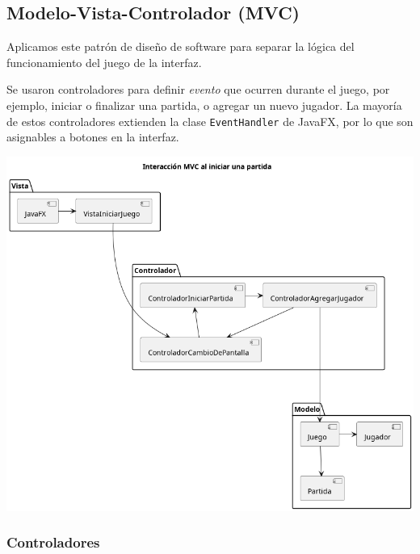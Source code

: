 \documentclass[titlepage,a4paper]{article}
\begin{document}
\subsection{Modelo-Vista-Controlador (MVC)}
\label{sec:orgc1514d0}

Aplicamos este patrón de diseño de software para separar la lógica del
funcionamiento del juego de la interfaz.

Se usaron controladores para definir \emph{evento} que ocurren durante el
juego, por ejemplo, iniciar o finalizar una partida, o agregar un
nuevo jugador. La mayoría de estos controladores extienden la clase
\texttt{EventHandler} de JavaFX, por lo que son asignables a botones en la
interfaz.

\begin{center}
\includegraphics[width=.9\linewidth]{./diagramas/mvc-partida.png}
\end{center}

\subsubsection{Controladores}
\label{sec:orge01cf69}
\end{document}
